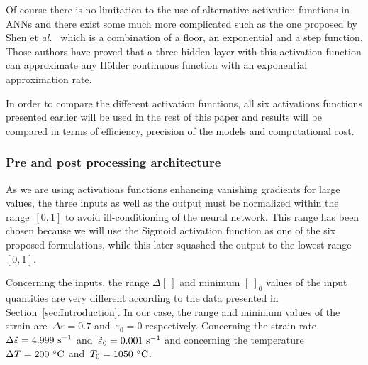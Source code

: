 \documentclass[algorithms,article,submit,pdftex,oneauthors]{Definitions/mdpi}
\makeatletter
\DeclareRobustCommand{\mdot}[1]{\accentset{\mbox{\bfseries .}}{#1}}
\DeclareRobustCommand{\eal}{et \emph{al.}\@\xspace}
\DeclareRobustCommand{\ps}{\text{s}^{-1}}
\makeatother
\begin{document}
Of course there is no limitation to the use of alternative activation functions in ANNs and there exist some much more complicated such as the one proposed by Shen \eal~\cite{Shen-2021-NNA} which is a combination of a floor, an exponential and a step function.
Those authors have proved that a three hidden layer with this activation function can approximate any Hölder continuous function with an exponential approximation rate.

In order to compare the different activation functions, all six activations functions presented earlier will be used in the rest of this paper and results will be compared in terms of efficiency,  precision of the models and computational cost.

\subsubsection{Pre and post processing architecture}\label{subsubsec:ANN-pre}

As we are using activations functions enhancing vanishing gradients for large values, the three inputs as well as the output must be normalized within the range~$[0,1]$ to avoid ill-conditioning of the neural network.
This range has been chosen because we will use the Sigmoid activation function as one of the six proposed formulations, while this later squashed the output to the lowest range~$[0,1]$.

Concerning the inputs, the range $\Delta[~]$ and minimum $[~]_{0}$ values of the input quantities are very different according to the data presented in Section~\ref{sec:Introduction}.
In our case, the range and minimum values of the strain are~$\Delta\varepsilon=0.7$ and~$\varepsilon_{0}=0$ respectively.
Concerning the strain rate~$\Delta\mdot{\varepsilon}=4.999~\ps$ and~$\mdot{\varepsilon}_{0}=0.001~\ps$ and concerning the temperature~$\Delta T=200~\celsius$ and~$T_{0}=1050~\celsius$.
\end{document}
